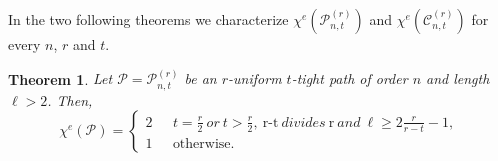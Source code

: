 \documentclass[12pt,a4paper]{article}
\newtheorem{theorem}{\bf Theorem}[section]
\begin{document}
In the two following theorems we characterize $\chi^{e}(\mathcal{P}_{n,t}^{(r)})$ and $\chi^{e}(\mathcal{C}_{n,t}^{(r)})$  for every $n$, $r$ and $t$.

\begin{theorem}\label{path}
	Let $\mathcal{P}=\mathcal{P}_{n,t}^{(r)} $ be an $ r$-uniform $ t$-tight path of order $n$ and  length $ \ell>2 $. Then,
	\begin{equation*}
	\chi^{e}(\mathcal{P})=
	\left\{
	\begin{array}{cl}
	2 & \ \ \ t=\frac{r}{2}\ or\  t>\frac{r}{2},\  \text{r-t}\  divides \  \text{r}\ and\  \ell \geq 2\frac{r}{r-t}-1,  \\
	1 & \ \ \ \text{otherwise.}
	\end{array}
	\right.
	\end{equation*}	
\end{theorem}
\end{document}
